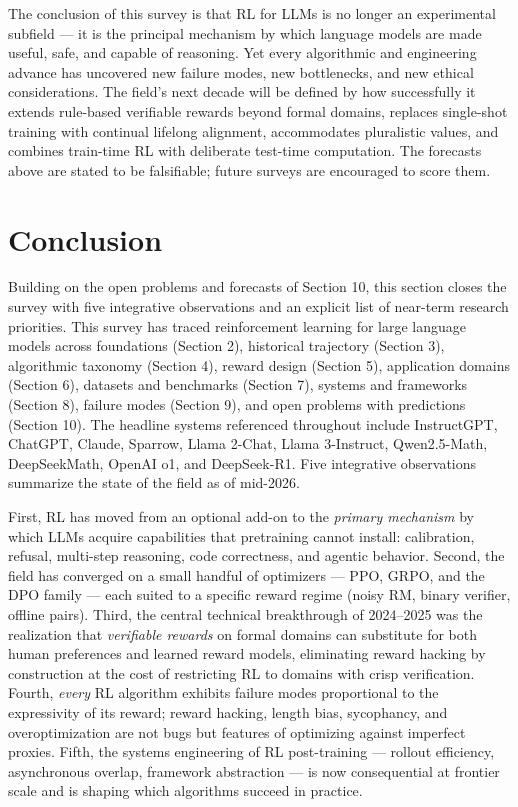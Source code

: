 The conclusion of this survey is that RL for LLMs is no longer an experimental subfield --- it is the principal mechanism by which language models are made useful, safe, and capable of reasoning. Yet every algorithmic and engineering advance has uncovered new failure modes, new bottlenecks, and new ethical considerations. The field's next decade will be defined by how successfully it extends rule-based verifiable rewards beyond formal domains, replaces single-shot training with continual lifelong alignment, accommodates pluralistic values, and combines train-time RL with deliberate test-time computation. The forecasts above are stated to be falsifiable; future surveys are encouraged to score them.

\section{Conclusion}\label{conclusion}

Building on the open problems and forecasts of Section 10, this section closes the survey with five integrative observations and an explicit list of near-term research priorities. This survey has traced reinforcement learning for large language models across foundations (Section 2), historical trajectory (Section 3), algorithmic taxonomy (Section 4), reward design (Section 5), application domains (Section 6), datasets and benchmarks (Section 7), systems and frameworks (Section 8), failure modes (Section 9), and open problems with predictions (Section 10). The headline systems referenced throughout include InstructGPT, ChatGPT, Claude, Sparrow, Llama 2-Chat, Llama 3-Instruct, Qwen2.5-Math, DeepSeekMath, OpenAI o1, and DeepSeek-R1. Five integrative observations summarize the state of the field as of mid-2026.

First, RL has moved from an optional add-on to the \emph{primary mechanism} by which LLMs acquire capabilities that pretraining cannot install: calibration, refusal, multi-step reasoning, code correctness, and agentic behavior. Second, the field has converged on a small handful of optimizers --- PPO, GRPO, and the DPO family --- each suited to a specific reward regime (noisy RM, binary verifier, offline pairs). Third, the central technical breakthrough of 2024--2025 was the realization that \emph{verifiable rewards} on formal domains can substitute for both human preferences and learned reward models, eliminating reward hacking by construction at the cost of restricting RL to domains with crisp verification. Fourth, \emph{every} RL algorithm exhibits failure modes proportional to the expressivity of its reward; reward hacking, length bias, sycophancy, and overoptimization are not bugs but features of optimizing against imperfect proxies. Fifth, the systems engineering of RL post-training --- rollout efficiency, asynchronous overlap, framework abstraction --- is now consequential at frontier scale and is shaping which algorithms succeed in practice.


